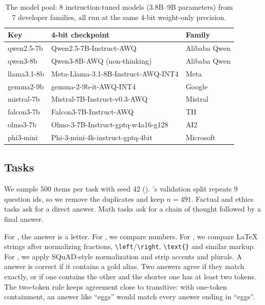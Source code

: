 \begin{table}[t]
    \centering
    \small
    \begin{tabular}{@{}lll@{}}
        \toprule
        \textbf{Key} & \textbf{4-bit checkpoint} & \textbf{Family} \\
        \midrule
        qwen2.5-7b  & Qwen2.5-7B-Instruct-AWQ & Alibaba Qwen \\
        qwen3-8b    & Qwen3-8B-AWQ (non-thinking) & Alibaba Qwen \\
        llama3.1-8b & Meta-Llama-3.1-8B-Instruct-AWQ-INT4 & Meta \\
        gemma2-9b   & gemma-2-9b-it-AWQ-INT4 & Google \\
        mistral-7b  & Mistral-7B-Instruct-v0.3-AWQ & Mistral \\
        falcon3-7b  & Falcon3-7B-Instruct-AWQ & TII \\
        olmo3-7b    & Olmo-3-7B-Instruct-gptq-w4a16-g128 & AI2 \\
        phi3-mini   & Phi-3-mini-4k-instruct-gptq-4bit & Microsoft \\
        \bottomrule
    \end{tabular}
    \caption{The model pool: 8 instruction-tuned models (3.8B--9B parameters) from 7 developer families, all run at the same 4-bit weight-only precision.}
    \label{tab:models}
\end{table}

\subsection{Tasks}
\label{sec:tasks}

We sample 500 items per task with seed 42 ().
\triviaqa's validation split repeats 9 question ids, so we remove the duplicates and keep $n=491$.
Factual and ethics tasks ask for a direct answer.
Math tasks ask for a chain of thought followed by a final answer.

For \mmlu, the answer is a letter.
For \gsm, we compare numbers.
For \mathfive, we compare \LaTeX{} strings after normalizing fractions, \texttt{\textbackslash left}/\texttt{\textbackslash right}, \texttt{\textbackslash text\{\}} and similar markup.
For \triviaqa, we apply SQuAD-style normalization and strip accents and plurals.
A \triviaqa answer is correct if it contains a gold alias.
Two \triviaqa answers agree if they match exactly, or if one contains the other and the shorter one has at least two tokens.
The two-token rule keeps agreement close to transitive: with one-token containment, an answer like ``eggs'' would match every answer ending in ``eggs''.

